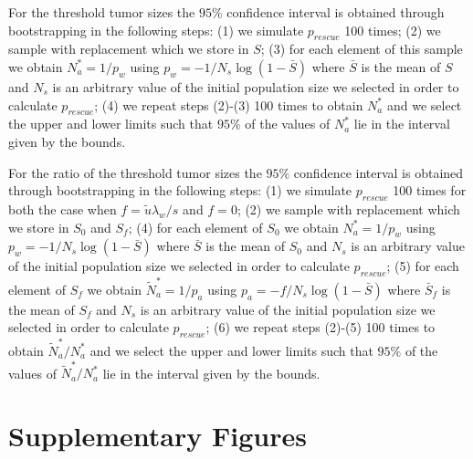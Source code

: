 \documentclass[12pt]{extarticle}
\newcommand{\beginsupplement}{%
      	\setcounter{table}{0}
        \renewcommand{\thetable}{S\arabic{table}}%
        \setcounter{figure}{0}
        \renewcommand{\thefigure}{S\arabic{figure}}%
		\setcounter{equation}{0}
        \renewcommand{\theequation}{A\arabic{equation}}%
}
\begin{document}
\begin{appendices}
For the threshold tumor sizes the $95\%$ confidence interval is obtained through bootstrapping in the following steps: (1) we simulate $p_{rescue}$ 100 times; (2) we sample with replacement which we store in $S$; (3) for each element of this sample we obtain $N_a^*=1/p_w$ using $p_w=-1/N_s\log\left(1-\bar{S}\right)$ where $\bar{S}$ is the mean of $S$ and $N_s$ is an arbitrary value of the initial population size we selected in order to calculate $p_{rescue}$; (4) we repeat steps (2)-(3) 100 times to obtain $N_a^*$ and we select the upper and lower limits such that $95\%$ of the values of $N_a^*$ lie in the interval given by the bounds.

For the ratio of the threshold tumor sizes the $95\%$ confidence interval is obtained through bootstrapping in the following steps: (1) we simulate $p_{rescue}$ 100 times for both the case when $f=\tilde{u}\lambda_w/s$ and $f=0$; (2) we sample with replacement which we store in $S_0$ and  $S_f$; (4) for each element of $S_0$ we obtain $N_a^*=1/p_w$ using $p_w=-1/N_s\log\left(1-\bar{S}\right)$ where $\bar{S}$ is the mean of $S_0$ and $N_s$ is an arbitrary value of the initial population size we selected in order to calculate $p_{rescue}$; (5) for each element of $S_f$ we obtain $\tilde{N}_a^*=1/p_a$ using $p_a=-f/N_s\log\left(1-\bar{S}\right)$ where $\bar{S}_f$ is the mean of $S_f$ and $N_s$ is an arbitrary value of the initial population size we selected in order to calculate $p_{rescue}$; (6) we repeat steps (2)-(5) 100 times to obtain $\tilde{N}_a^*/N_a^*$ and we select the upper and lower limits such that $95\%$ of the values of $\tilde{N}_a^*/N_a^*$ lie in the interval given by the bounds.

\newpage
\section*{Supplementary Figures}
\beginsupplement %


\end{appendices}
\end{document}
